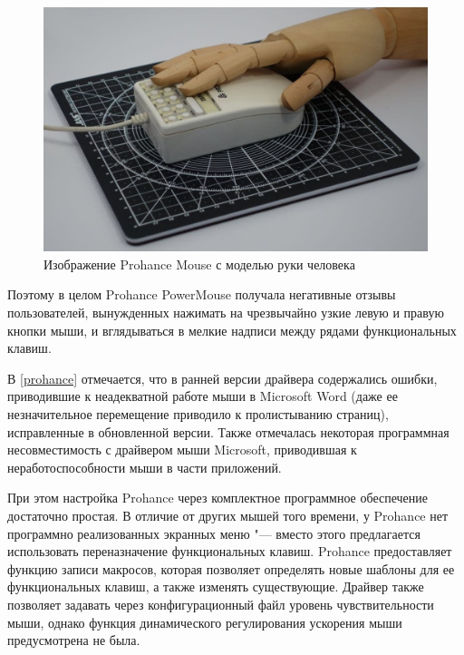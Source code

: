 \documentclass[11pt, a4paper]{article}
\begin{document}
\begin{figure}[h]
    \centering
    \includegraphics[scale=0.3]{1989_prohance_powermouse/5.2.jpg}
    \caption{Изображение Prohance Mouse с моделью руки человека}
    \label{fig:ProhanceHand}
\end{figure}

Поэтому в целом Prohance PowerMouse получала негативные отзывы пользователей, вынужденных нажимать на чрезвычайно узкие левую и правую кнопки мыши, и вглядываться в мелкие надписи между рядами функциональных клавиш.

В \ref{prohance} отмечается, что в ранней версии драйвера содержались ошибки, приводившие к неадекватной работе мыши в Microsoft Word (даже ее незначительное перемещение приводило к пролистыванию страниц), исправленные в обновленной версии. Также отмечалась некоторая программная несовместимость с драйвером мыши Microsoft, приводившая к неработоспособности мыши в части приложений.

При этом настройка Prohance через комплектное программное обеспечение достаточно простая. В отличие от других мышей того времени, у Prohance нет программно реализованных экранных меню "--- вместо этого предлагается использовать переназначение функциональных клавиш. Prohance предоставляет функцию записи макросов, которая позволяет определять новые шаблоны для ее функциональных клавиш, а также изменять существующие.
Драйвер также позволяет задавать через конфигурационный файл уровень чувствительности мыши, однако функция динамического регулирования ускорения мыши предусмотрена не была.
\end{document}

